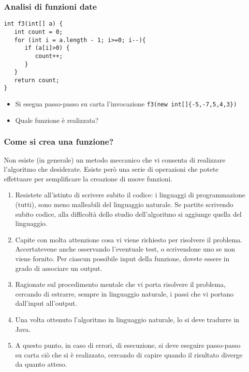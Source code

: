 \documentclass{beamer}
\begin{document}
\begin{frame}[fragile]
\frametitle{Analisi di funzioni date}
\begin{verbatim}
int f3(int[] a) {
   int count = 0;
   for (int i = a.length - 1; i>=0; i--){
      if (a[i]>0) {
         count++;
      }
   }
   return count;
}
\end{verbatim}
\begin{itemize}
 \item Si esegua passo-passo su carta l'invocazione \texttt{f3(new int[]\{-5,-7,5,4,3\})}
 \item Quale funzione è realizzata?
\end{itemize}
\end{frame}

\begin{frame}[fragile]
\frametitle{Come si crea una funzione?}
\small
Non esiste (in generale) un metodo meccanico che vi consenta di realizzare l'algoritmo che desiderate. Esiste però una serie di operazioni che potete effettuare per semplificare la creazione di nuove funzioni.
\begin{enumerate}
 \item Resistete all'istinto di scrivere subito il codice: i linguaggi di programmazione (tutti), sono meno malleabili del linguaggio naturale. Se partite scrivendo subito codice, alla difficoltà dello studio dell'algoritmo si aggiunge quella del linguaggio.
 \item Capite con molta attenzione cosa vi viene richiesto per risolvere il problema. Accertatevene anche osservando l'eventuale test, o scrivendone uno se non viene fornito. Per ciascun possibile input della funzione, dovete essere in grado di associare un output.
 \item Ragionate sul procedimento mentale che vi porta risolvere il problema, cercando di estrarre, sempre in linguaggio naturale, i passi che vi portano dall'input all'output.
 \item Una volta ottenuto l'algoritmo in linguaggio naturale, lo si deve tradurre in Java.
 \item A questo punto, in caso di errori, di esecuzione, si deve eseguire passo-passo su carta ciò che si è realizzato, cercando di capire quando il risultato diverge da quanto atteso.
\end{enumerate}
\end{frame}
\end{document}
